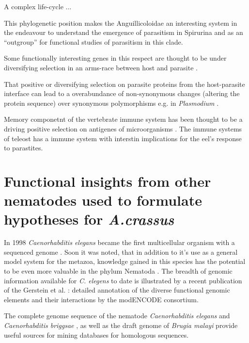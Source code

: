 A complex life-cycle ... 



This phylogenetic position makes the Anguillicoloidae an interesting
system in the endeavour to understand the emergence of parasitism in
Spirurina and as an ``outgroup'' for functional studies of parasitism
in this clade.

Some functionally interesting genes in this respect are thought to be
under diversifying selection in an arms-race between host and parasite
\cite{zang_serine_2001}.

That positive or diversifying selection on parasite proteins from the
host-parasite interface can lead to a overabundance of non-synonymous
changes (altering the protein sequence) over synonymous polymorphisms
e.g. in \textit{Plasmodium} \cite{pmid7630387}.

Memory componetnt of the vertebrate immune system has been thought to
be a driving positive selection on antigenes of microorganisms
\cite{conway_measuring_2002}. The immune systems of teleost has a
immune system with interstin implications for the eel’s response to
parastites.


\section{Functional insights from other nematodes used to formulate
  hypotheses for \textit{A.crassus}}
\label{func-ins}

In 1998 \textit{Caenorhabditis elegans} became the first multicellular
organism with a sequenced genome \cite{pmid9851916}. Soon it was
noted, that in addition to it's use as a general model system for the
metazoa, knowledge gained in this species has the potential to be even
more valuable in the phylum Nematoda
\cite{blaxter_caenorhabditis_1998}. The breadth of genomic information
available for \textit{C. elegens} to date is illustrated by a recent
publication of the Gerstein et al. \cite{pmid21177976}: detailed
annotation of the diverse functional genomic elements and their
interactions by the modENCODE consortium.

The complete genome sequence of the nematode \textit{Caenorhabditis
  elegans} \cite{pmid9851916} and \textit{Caenorhabditis briggsae}
\cite{stein_genome_2003}, as well as the draft genome of
\textit{Brugia malayi} \cite{ghedin_draft_2007} provide useful sources
for mining databases for homologous sequences.

